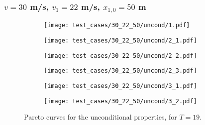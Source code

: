 
\subsubsection{$v = 30$ m/s, $v_1 = 22$ m/s, $x_{1,0} = 50$ m}

\begin{figure}[H]
\centering
\begin{subfigure}{0.49\textwidth}
  \centering
  \texttt{[image: test\_cases/30\_22\_50/uncond/1.pdf]}
\end{subfigure}
\begin{subfigure}{0.49\textwidth}
  \centering
  \texttt{[image: test\_cases/30\_22\_50/uncond/2\_1.pdf]}
\end{subfigure} 
\begin{subfigure}{0.49\textwidth}
  \centering
  \texttt{[image: test\_cases/30\_22\_50/uncond/2\_2.pdf]}
\end{subfigure}
\begin{subfigure}{0.49\textwidth}
  \centering
  \texttt{[image: test\_cases/30\_22\_50/uncond/2\_3.pdf]}
\end{subfigure}
\begin{subfigure}{0.49\textwidth}
  \centering
  \texttt{[image: test\_cases/30\_22\_50/uncond/3\_1.pdf]}
\end{subfigure}
\begin{subfigure}{0.49\textwidth}
  \centering
  \texttt{[image: test\_cases/30\_22\_50/uncond/3\_2.pdf]}
\end{subfigure}
\caption{Pareto curves for the unconditional properties, for $T = 19$.}
\end{figure}

